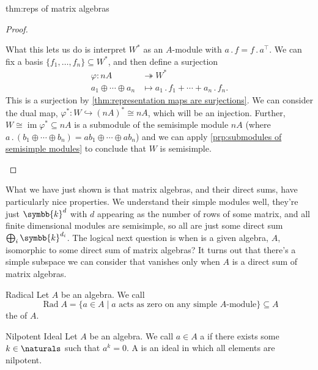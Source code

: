 \documentclass[fleqn]{NotesClass}
\renewcommand{\field}{\symbb{k}}
\newcommand{\action}{\mathbin{.}}
\DeclareMathOperator{\im}{im}
\newcommand{\isomorphic}{\cong}
\newcommand{\trans}{\top}
\DeclareMathOperator{\Rad}{Rad}
\begin{document}
\begin{thm}{}{thm:reps of matrix algebras}
\begin{proof}
\begin{enumerate}
                What this lets us do is interpret \(W^*\) as an \(A\)-module with \(a \action f = f \action a^{\trans}\).
                We can fix a basis \(\{f_1, \dotsc, f_n\} \subseteq W^*\), and then define a surjection
                \begin{align}
                    \varphi \colon nA &\twoheadrightarrow W^*\\
                    a_1 \oplus \dotsb \oplus a_n &\mapsto a_1 \action f_1 + \dotsb + a_n \action f_n.
                \end{align}
                This is a surjection by \cref{thm:representation maps are surjections}.
                We can consider the dual map, \(\varphi^* \colon W \hookrightarrow (nA)^* \isomorphic nA\), which will be an injection.
                Further, \(W \isomorphic \im \varphi^* \subseteq nA\) is a submodule of the semisimple module \(nA\) (where \(a \action (b_1 \oplus \dotsb \oplus b_n) = ab_1 \oplus \dotsb \oplus ab_n\)) and we can apply \cref{prp:submodules of semisimple modules} to conclude that \(W\) is semisimple.
            \end{enumerate}
        \end{proof}
    \end{thm}
    
    What we have just shown is that matrix algebras, and their direct sums, have particularly nice properties.
    We understand their simple modules well, they're just \(\field^{d}\) with \(d\) appearing as the number of rows of some matrix, and all finite dimensional modules are semisimple, so all are just some direct sum \(\bigoplus_i \field^{d_i}\).
    The logical next question is when is a given algebra, \(A\), isomorphic to some direct sum of matrix algebras?
    It turns out that there's a simple subspace we can consider that vanishes only when \(A\) is a direct sum of matrix algebras.
    
    \begin{dfn}{Radical}{}
        Let \(A\) be an algebra.
        We call
        \begin{equation}
            \Rad A = \{a \in A \mid a \text{ acts as zero on any simple } A \text{-module}\} \subseteq A
        \end{equation}
        the  of \(A\).
    \end{dfn}
    
    \begin{dfn}{Nilpotent Ideal}{}
        Let \(A\) be an algebra.
        We call \(a \in A\) a  if there exists some \(k \in \naturals\) such that \(a^k = 0\).
        A  is an ideal in which all elements are nilpotent.
    \end{dfn}
    
\end{document}
